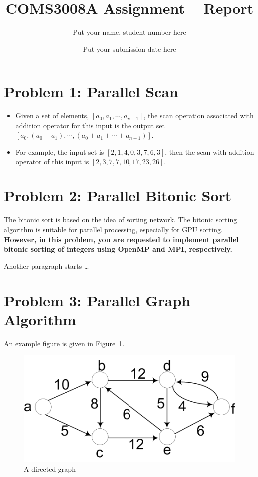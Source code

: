 

\title{COMS3008A Assignment -- Report}
\author{Put your name, student number here}
\date{Put your submission date here} 
\maketitle 
\pagestyle{fancy}
\fancyhf{}
\fancyhead[R]{\thepage}
{} 
\section{Problem 1: Parallel Scan}
\begin{itemize}
	\item  Given a set of elements, $[a_0,a_1,\dotsm,a_{n-1}]$, the scan operation associated with addition operator for this input is the output set $[a_0,(a_0+a_1),\dotsm,(a_0+a_1+\dotsm+a_{n-1})]$. 
	\item For example, the input set is $[2,1,4,0,3,7,6,3]$, then the scan with addition operator of this input is $[2,3,7,7,10,17,23,26]$. 
\end{itemize}

\section{Problem 2: Parallel Bitonic Sort}
The bitonic sort is based on the idea of sorting network. The bitonic sorting algorithm is suitable for parallel processing, especially for GPU sorting. \textbf{However, in this problem, you are requested to implement parallel bitonic sorting of integers using \textbf{OpenMP and MPI}, respectively. }

Another paragraph starts \dots
\section{Problem 3: Parallel Graph Algorithm}
An example figure is given in Figure~\ref{fig:sp_fig1}.
\begin{figure}[htb]
	\centering
	\includegraphics[width=0.5\linewidth]{pics/sp_fig1.png}
	\caption{A directed graph}\label{fig:sp_fig1}
\end{figure}

